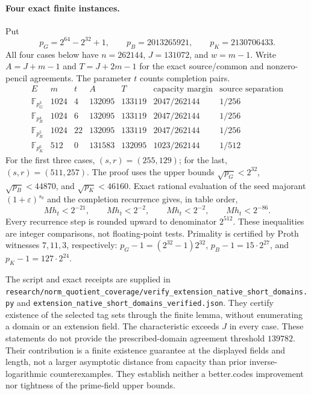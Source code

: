 \paragraph{Four exact finite instances.}
Put
\[
 p_G=2^{64}-2^{32}+1,\qquad
 p_B=2013265921,\qquad p_K=2130706433.
\]
All four cases below have $n=262144$, $J=131072$, and $w=m-1$.
Write $A=J+m-1$ and $T=J+2m-1$ for the exact source/common and
nonzero-pencil agreements.  The parameter $t$ counts completion pairs.
\[
\begin{array}{c|r|r|r|r|c|c}
 E&m&t&A&T&\text{capacity margin}&\text{source separation}\\\hline
 \mathbb F_{p_G^3}&1024&4&132095&133119&2047/262144&1/256\\
 \mathbb F_{p_B^4}&1024&6&132095&133119&2047/262144&1/256\\
 \mathbb F_{p_B^5}&1024&22&132095&133119&2047/262144&1/256\\
 \mathbb F_{p_K^6}&512&0&131583&132095&1023/262144&1/512
\end{array}
\]
For the first three cases, $(s,r)=(255,129)$; for the last,
$(s,r)=(511,257)$.  The proof uses the upper bounds
$\sqrt{p_G}<2^{32}$, $\sqrt{p_B}<44870$, and
$\sqrt{p_K}<46160$.  Exact rational evaluation of the seed majorant
$(1+\varepsilon)^{s_0}$ and the completion recurrence gives,
in table order,
\[
 Mh_t<2^{-21},\qquad Mh_t<2^{-2},\qquad
 Mh_t<2^{-2},\qquad Mh_t<2^{-86}.
\]
Every recurrence step is rounded upward to denominator $2^{512}$.
These inequalities are integer comparisons, not floating-point tests.
Primality is certified by Proth witnesses $7,11,3$, respectively:
$p_G-1=(2^{32}-1)2^{32}$, $p_B-1=15\cdot2^{27}$, and
$p_K-1=127\cdot2^{24}$.

The script and exact receipts are supplied in
\nolinkurl{research/norm_quotient_coverage/verify_extension_native_short_domains.py}
and \nolinkurl{extension_native_short_domains_verified.json}.
They certify existence of the selected tag sets through the finite
lemma, without enumerating a domain or an extension field.  The
characteristic exceeds $J$ in every case.  These statements do not
provide the prescribed-domain agreement threshold $139782$.  Their
contribution is a finite existence guarantee at the displayed fields and
length, not a larger asymptotic distance from capacity than prior
inverse-logarithmic counterexamples.  They establish neither a
better.codes improvement nor tightness of the prime-field upper bounds.


